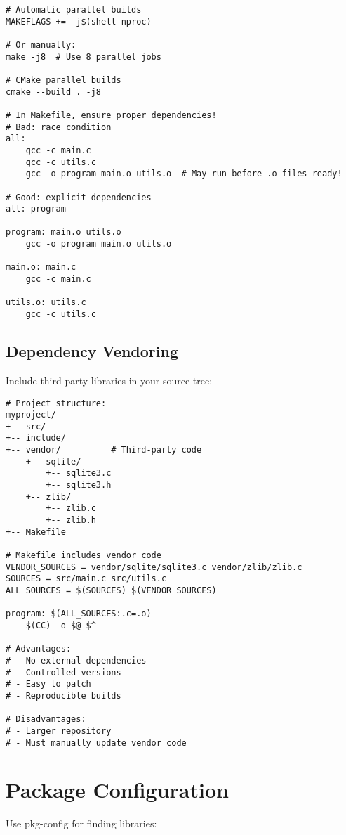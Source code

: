 \begin{lstlisting}
# Automatic parallel builds
MAKEFLAGS += -j$(shell nproc)

# Or manually:
make -j8  # Use 8 parallel jobs

# CMake parallel builds
cmake --build . -j8

# In Makefile, ensure proper dependencies!
# Bad: race condition
all:
	gcc -c main.c
	gcc -c utils.c
	gcc -o program main.o utils.o  # May run before .o files ready!

# Good: explicit dependencies
all: program

program: main.o utils.o
	gcc -o program main.o utils.o

main.o: main.c
	gcc -c main.c

utils.o: utils.c
	gcc -c utils.c
\end{lstlisting}

\subsection{Dependency Vendoring}

Include third-party libraries in your source tree:

\begin{lstlisting}
# Project structure:
myproject/
+-- src/
+-- include/
+-- vendor/          # Third-party code
    +-- sqlite/
        +-- sqlite3.c
        +-- sqlite3.h
    +-- zlib/
        +-- zlib.c
        +-- zlib.h
+-- Makefile

# Makefile includes vendor code
VENDOR_SOURCES = vendor/sqlite/sqlite3.c vendor/zlib/zlib.c
SOURCES = src/main.c src/utils.c
ALL_SOURCES = $(SOURCES) $(VENDOR_SOURCES)

program: $(ALL_SOURCES:.c=.o)
	$(CC) -o $@ $^

# Advantages:
# - No external dependencies
# - Controlled versions
# - Easy to patch
# - Reproducible builds

# Disadvantages:
# - Larger repository
# - Must manually update vendor code
\end{lstlisting}

\section{Package Configuration}

Use pkg-config for finding libraries:

